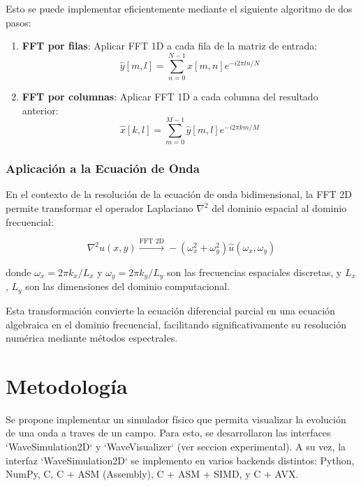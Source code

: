\documentclass[a4paper]{article}
\begin{document}
Esto se puede implementar eficientemente mediante el siguiente algoritmo de dos pasos:

\begin{enumerate}
    \item \textbf{FFT por filas}: Aplicar FFT 1D a cada fila de la matriz de entrada:
          \begin{equation}
              \hat{y}[m,l] = \sum_{n=0}^{N-1} x[m,n] e^{-i2\pi ln/N}
          \end{equation}

    \item \textbf{FFT por columnas}: Aplicar FFT 1D a cada columna del resultado anterior:
          \begin{equation}
              \hat{x}[k,l] = \sum_{m=0}^{M-1} \hat{y}[m,l] e^{-i2\pi km/M}
          \end{equation}
\end{enumerate}

\subsubsection{Aplicación a la Ecuación de Onda}

En el contexto de la resolución de la ecuación de onda bidimensional, la FFT 2D permite transformar el operador Laplaciano $\nabla^2$
del dominio espacial al dominio frecuencial:

\begin{equation}
    \nabla^2 u(x,y) \xrightarrow{\text{FFT 2D}} -(\omega_x^2 + \omega_y^2) \hat{u}(\omega_x, \omega_y)
\end{equation}

donde $\omega_x = 2\pi k_x/L_x$ y $\omega_y = 2\pi k_y/L_y$ son las frecuencias espaciales discretas, y $L_x$, $L_y$ son las
dimensiones del dominio computacional.

Esta transformación convierte la ecuación diferencial parcial en una ecuación algebraica en el dominio frecuencial, facilitando
significativamente su resolución numérica mediante métodos espectrales.

\section{Metodología}
Se propone implementar un simulador físico que permita visualizar la evolución de una onda a traves de un campo. Para esto, se desarrollaron
las interfaces `WaveSimulation2D` y `WaveVisualizer` (ver seccion experimental). A su vez, la interfaz `WaveSimulation2D` se implemento en varios
backends distintos: Python, NumPy, C, C + ASM (Assembly), C + ASM + SIMD, y C + AVX.
\end{document}
